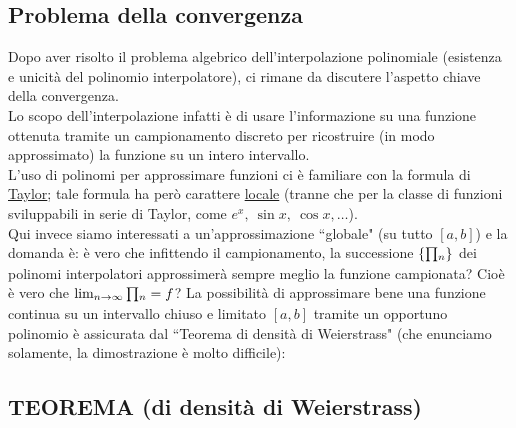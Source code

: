 \subsection{Problema della convergenza}
Dopo aver risolto il problema algebrico dell'interpolazione polinomiale (esistenza e unicità del polinomio interpolatore), ci rimane da discutere l'aspetto chiave della convergenza.\\
Lo scopo dell'interpolazione infatti è di usare l'informazione su una funzione ottenuta tramite un campionamento discreto per ricostruire (in modo approssimato)
la funzione su un intero intervallo.\\
L'uso di polinomi per approssimare funzioni ci è familiare con la formula di \uline{Taylor}; tale formula ha però carattere \uline{locale} (tranne che per la classe di funzioni sviluppabili in serie di Taylor, come $e^x,\ \sin{x},\ \cos{x}, \dotso$).\\
Qui invece siamo interessati a un'approssimazione ``globale" (su tutto $[a,b]$) e la domanda è: è vero che infittendo il campionamento, la successione $\{\begin{matrix}\prod\end{matrix}_n\}$ dei polinomi interpolatori
approssimerà sempre meglio la funzione campionata? Cioè è vero che $\lim_{n \to \infty} \begin{matrix}\prod\end{matrix}_n = f$? \newline \newline
La possibilità di approssimare bene una funzione continua su un intervallo chiuso e limitato $[a,b]$ tramite un opportuno polinomio è assicurata dal ``Teorema di densità di Weierstrass" (che enunciamo solamente, la dimostrazione è molto difficile):


\subsection{TEOREMA (di densità di Weierstrass)}
\begin{center}
\end{center}

